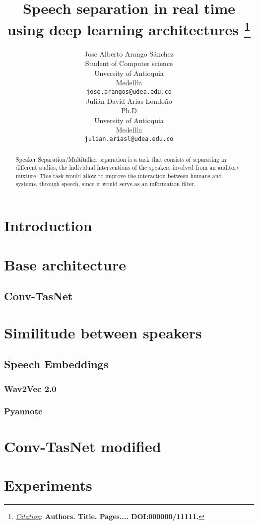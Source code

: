 \documentclass{article}
\title{Speech separation in real time using deep learning architectures
\thanks{\textit{\underline{Citation}}: 
\textbf{Authors. Title. Pages.... DOI:000000/11111.}} 
}
\author{
  Jose Alberto Arango Sánchez\\
  Student of Computer science \\
  Unversity of Antioquia \\
  Medellín\\
  \texttt{jose.arangos@udea.edu.co} \\
   \And
  Julián David Arias Londoño \\
  Ph.D \\
  Unversity of Antioquia \\
  Medellín\\
  \texttt{julian.ariasl@udea.edu.co} \\
}
\begin{document}
\begin{abstract}
Speaker Separation/Multitalker separation is a task that consists of separating in different audios, the individual interventions of the speakers involved from an auditory mixture. This task would allow to improve the interaction between humans and systems, through speech, since it would serve as an information filter.

\end{abstract}




\section{Introduction}


\section{Base architecture}

\subsection{Conv-TasNet}


\section{Similitude between speakers}

\subsection{Speech Embeddings}

\subsubsection{Wav2Vec 2.0}
\subsubsection{Pyannote}

\section{Conv-TasNet modified}




\section{Experiments}
\end{document}
